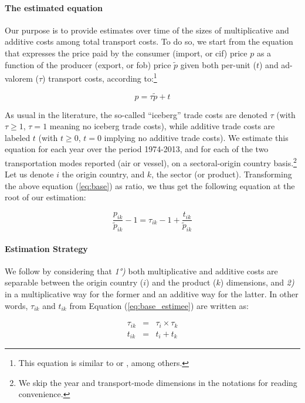 \documentclass[a4paper,11pt]{article}
\begin{document}
\paragraph{The estimated equation} Our purpose is to provide estimates over time of the sizes of multiplicative and additive costs among total transport costs. To do so, we start from the equation that expresses the price paid by the consumer (import, or cif) price $p$ as a function of the producer (export, or fob) price $\widetilde{p}$ given both per-unit ($t$) and ad-valorem ($\tau$) transport costs, according to:\footnote{This equation is similar to \cite{Irrazabal_2015} or \cite{martin2012}, among others.}

\begin{equation}
p = \tau \widetilde{p} + t \label{eq:base}
\end{equation}

\noindent As usual in the literature, the so-called ``iceberg'' trade costs are denoted $\tau$ (with  $\tau \geq 1$, $\tau=1$ meaning no iceberg trade costs), while additive trade costs are labeled $t$ (with $t \geq 0$, $t=0$ implying no additive trade costs). We estimate this equation for each year over the period 1974-2013, and for each of the two transportation modes reported (air or vessel), on a sectoral-origin country basis.\footnote{We skip the year and transport-mode dimensions in the notations for reading convenience.} Let us denote $i$ the origin country, and $k$, the sector (or product). Transforming the above equation (\ref{eq:base}) as ratio, we thus get the following equation at the root of our estimation:

\begin{equation*}
\frac{p_{ik}}{\widetilde{p}_{ik}} -1 = \tau_{ik} -1 +\frac{t_{ik}}{ \widetilde{p}_{ik}} \label{eq:base_estimee}
\end{equation*}


\paragraph{Estimation Strategy} We follow \citet{Irrazabal_2015} by considering that \textit{1°)} both multiplicative and additive costs are separable between the origin country ($i$) and the product ($k$) dimensions, and \textit{2)} in a multiplicative way for the former and an additive way for the latter. In other words, $\tau_{ik}$ and $t_{ik}$ from Equation (\ref{eq:base_estimee}) are written as:

\begin{eqnarray}
\tau_{ik} &=& \tau_{i} \times \tau_{k} \label{eq:iceberg}\\
t_{ik} &=& t_{i} + t_{k} \label{eq:add}
\end{eqnarray}
\end{document}
